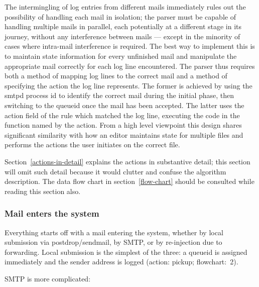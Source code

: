 \documentclass[a4paper,12pt,draft]{article}
\begin{document}
The intermingling of log entries from different mails immediately rules out
the possibility of handling each mail in isolation; the parser must be
capable of handling multiple mails in parallel, each potentially at a
different stage in its journey, without any interference between mails ---
except in the minority of cases where intra-mail interference is required.
The best way to implement this is to maintain state information for every
unfinished mail and manipulate the appropriate mail correctly for each log
line encountered.  The parser thus requires both a method of mapping log
lines to the correct mail and a method of specifying the action the log
line represents.  The former is achieved by using the smtpd process id to
identify the correct mail during the initial phase, then switching to the
queueid once the mail has been accepted.  The latter uses the action field
of the rule which matched the log line, executing the code in the function
named by the action.  From a high level viewpoint this design shares
significant similarity with how an editor maintains state for multiple
files and performs the actions the user initiates on the correct file.

Section~\ref{actions-in-detail} explains the actions in substantive detail;
this section will omit such detail because it would clutter and confuse the
algorithm description.  The data flow chart in section~\ref{flow-chart}
should be consulted while reading this section also.

\subsubsection{Mail enters the system}

\label{mail-enters-the-system}

Everything starts off with a mail entering the system, whether by local
submission via postdrop/sendmail, by SMTP, or by re-injection due to
forwarding.  Local submission is the simplest of the three: a queueid is
assigned immediately and the sender address is logged (action: pickup;
flowchart:~2).

SMTP is more complicated: 
\end{document}

